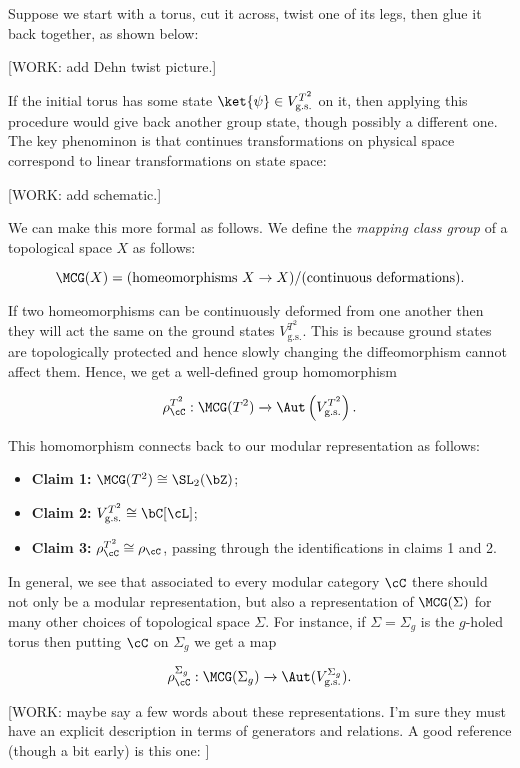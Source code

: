 Suppose we start with a torus, cut it across, twist one of its legs, then glue it back together, as shown below:

[WORK: add Dehn twist picture.]

If the initial torus has some state $\ket{\psi}\in V_{\text{g.s.}}^{T^2}$ on it, then applying this procedure would give back another group state, though possibly a different one. The key phenominon is that continues transformations on physical space correspond to linear transformations on state space:

[WORK: add schematic.]

We can make this more formal as follows. We define the \textit{mapping class group} of a topological space $X$ as follows:

$$\MCG(X)=(\text{homeomorphisms $X\to X$})/(\text{continuous deformations}).$$

If two homeomorphisms can be continuously deformed from one another then they will act the same on the ground states $V_{\text{g.s.}}^{T^2}$. This is because ground states are topologically protected and hence slowly changing the diffeomorphism cannot affect them. Hence, we get a well-defined group homomorphism

$$\rho_{\cC}^{T^2}:\MCG(T^2)\xrightarrow{}\Aut\left(V_{\text{g.s.}}^{T^2}\right).$$

This homomorphism connects back to our modular representation as follows:

\begin{itemize}
\item \textbf{Claim 1:} $\MCG(T^2)\cong \SL_2(\bZ)$;

\item \textbf{Claim 2:} $V_{\text{g.s.}}^{T^2}\cong \bC[\cL]$;

\item \textbf{Claim 3:} $\rho_{\cC}^{T^2}\cong \rho_{\cC}$, passing through the identifications in claims 1 and 2.
\end{itemize}

In general, we see that associated to every modular category $\cC$ there should not only be a modular representation, but also a representation of $\MCG(\Sigma)$ for many other choices of topological space $\Sigma$. For instance, if $\Sigma=\Sigma_g$ is the $g$-holed torus then putting $\cC$ on $\Sigma_g$ we get a map

$$\rho_{\cC}^{\Sigma_g}:\MCG(\Sigma_g)\xrightarrow{}\Aut(V_{\text{g.s.}}^{\Sigma_g}).$$

[WORK: maybe say a few words about these representations. I'm sure they must have an explicit description in terms of generators and relations. A good reference (though a bit early) is this one: \cite{lyubashenko1995invariants}]


